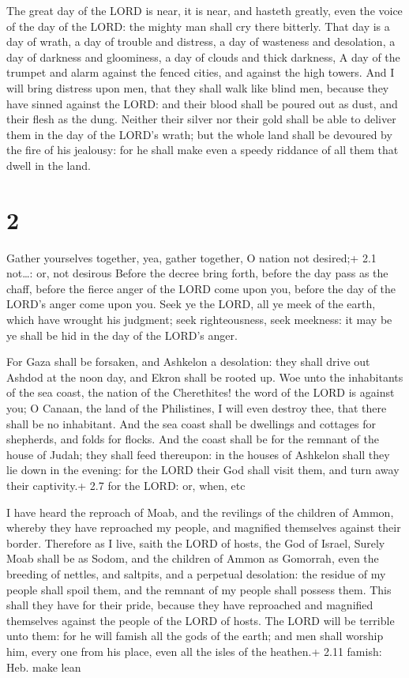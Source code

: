  The great day of the LORD is near, it is near, and hasteth
greatly, even the voice of the day of the LORD: the mighty man shall cry
there bitterly.  That day is a day of wrath, a day of
trouble and distress, a day of wasteness and desolation, a day of
darkness and gloominess, a day of clouds and thick darkness,
 A day of the trumpet and alarm against the fenced cities,
and against the high towers.  And I will bring distress
upon men, that they shall walk like blind men, because they have sinned
against the LORD: and their blood shall be poured out as dust, and their
flesh as the dung.  Neither their silver nor their gold
shall be able to deliver them in the day of the LORD's wrath; but the
whole land shall be devoured by the fire of his jealousy: for he shall
make even a speedy riddance of all them that dwell in the land.

\hypertarget{section-1}{%
\section{2}\label{section-1}}

 Gather yourselves together, yea, gather together, O nation
not desired;+ 2.1 not\ldots: or, not desirous  Before the
decree bring forth, before the day pass as the chaff, before the fierce
anger of the LORD come upon you, before the day of the LORD's anger come
upon you.  Seek ye the LORD, all ye meek of the earth, which
have wrought his judgment; seek righteousness, seek meekness: it may be
ye shall be hid in the day of the LORD's anger.

 For Gaza shall be forsaken, and Ashkelon a desolation:
they shall drive out Ashdod at the noon day, and Ekron shall be rooted
up.  Woe unto the inhabitants of the sea coast, the nation
of the Cherethites! the word of the LORD is against you; O Canaan, the
land of the Philistines, I will even destroy thee, that there shall be
no inhabitant.  And the sea coast shall be dwellings and
cottages for shepherds, and folds for flocks.  And the coast
shall be for the remnant of the house of Judah; they shall feed
thereupon: in the houses of Ashkelon shall they lie down in the evening:
for the LORD their God shall visit them, and turn away their captivity.+
2.7 for the LORD: or, when, etc

 I have heard the reproach of Moab, and the revilings of
the children of Ammon, whereby they have reproached my people, and
magnified themselves against their border.  Therefore as I
live, saith the LORD of hosts, the God of Israel, Surely Moab shall be
as Sodom, and the children of Ammon as Gomorrah, even the breeding of
nettles, and saltpits, and a perpetual desolation: the residue of my
people shall spoil them, and the remnant of my people shall possess
them.  This shall they have for their pride, because they
have reproached and magnified themselves against the people of the LORD
of hosts.  The LORD will be terrible unto them: for he will
famish all the gods of the earth; and men shall worship him, every one
from his place, even all the isles of the heathen.+ 2.11 famish: Heb.
make lean

